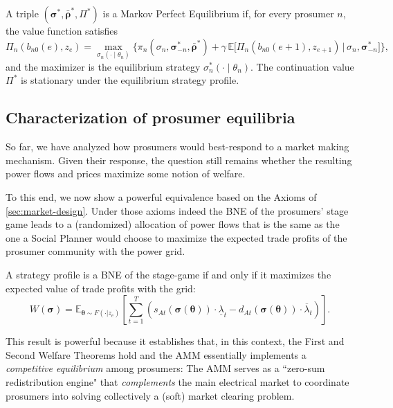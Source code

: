 \documentclass[12pt, notitlepage]{article}
\begin{document}
\begin{definition}[MPE]
A triple $(\boldsymbol{\sigma}^*, \bar{\boldsymbol{\rho}}^*, \Pi^*)$ is a Markov Perfect Equilibrium if, for every prosumer $n$, the value function satisfies
\[
\Pi_n(b_{n0}(e), z_e)
=
\max_{\sigma_n(\cdot \mid \theta_n)}
\Big\{
    \pi_n(\sigma_n, \boldsymbol{\sigma}_{-n}^*, \bar{\boldsymbol{\rho}}^*)
    + \gamma\, 
        \mathbb{E}\big[
            \Pi_n(b_{n0}(e+1), z_{e+1})
        \,\big|\,
            \sigma_n, \boldsymbol{\sigma}_{-n}^*
        \big]
\Big\},
\]
and the maximizer is the equilibrium strategy $\sigma_n^*(\cdot \mid \theta_n)$.  
The continuation value $\Pi^*$ is stationary under the equilibrium strategy profile.
\end{definition}


\subsection{Characterization of prosumer equilibria}


 So far, we have analyzed how prosumers would best-respond to a market making mechanism. Given their response, the question still remains whether the resulting power flows and prices maximize some notion of welfare. 


 
 
To this end, we now show a powerful equivalence based on the Axioms of \cref{sec:market-design}. Under those axioms indeed the BNE of the prosumers' stage game leads to a (randomized) allocation of power flows that is the same as the one a Social Planner would choose to maximize the expected trade profits of the prosumer community with the power grid.



\begin{proposition} \label{prop-welfare-equilvanence}
A strategy profile is a BNE of the stage-game if and only if it maximizes the expected value of trade profits with the grid:
\begin{equation} \label{eq:welfare-exp} W(\boldsymbol{\sigma}) =
\mathbb{E}_{\boldsymbol{\theta} \sim F(\cdot|z_e)} \left[ \sum_{t=1}^T \left( s_{At}(\boldsymbol{\sigma}(\boldsymbol{\theta})) \cdot \underline{\lambda}_t - d_{At}(\boldsymbol{\sigma}(\boldsymbol{\theta})) \cdot \overline{\lambda}_t \right) \right].
\end{equation}
\end{proposition}


This result is powerful because it establishes that, in this context, the First and Second Welfare Theorems hold \citep{mascolell1995} and the AMM essentially implements a \textit{competitive equilibrium} among prosumers: The AMM serves as a ``zero-sum redistribution engine" that \textit{complements} the main electrical market to coordinate prosumers into solving collectively a (soft) market clearing problem. 
\end{document}

